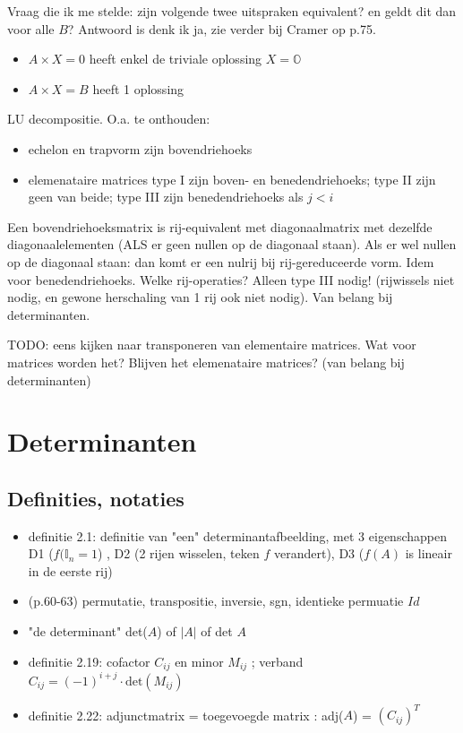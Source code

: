 \documentclass{article}
\begin{document}
Vraag die ik me stelde: zijn volgende twee uitspraken equivalent? en geldt dit dan voor alle $B$? Antwoord is denk ik ja, zie verder bij Cramer op p.75. 
\begin{itemize}
    \item $A\times X = 0$ heeft enkel de triviale oplossing $X=\mathbb{O}$
    \item $A \times X = B$ heeft 1 oplossing 
\end{itemize}

LU decompositie. O.a. te onthouden: 
\begin{itemize}
    \item echelon en trapvorm zijn bovendriehoeks
    \item elemenataire matrices type I zijn boven- en benedendriehoeks; type II zijn geen van beide; type III zijn benedendriehoeks als $j<i$
\end{itemize}

Een bovendriehoeksmatrix is rij-equivalent met diagonaalmatrix met dezelfde diagonaalelementen (ALS er geen nullen op de diagonaal staan). 
Als er wel nullen op de diagonaal staan: dan komt er een nulrij bij rij-gereduceerde vorm. Idem voor benedendriehoeks. Welke rij-operaties? Alleen type III nodig! (rijwissels niet nodig, en gewone herschaling van 1 rij ook niet nodig). Van belang bij determinanten. 

TODO: eens kijken naar transponeren van elementaire matrices. Wat voor matrices worden het? Blijven het elemenataire matrices? (van belang bij determinanten) 


\section{Determinanten}

\subsection{Definities, notaties}

\begin{itemize}
    \item definitie 2.1: definitie van "een" determinantafbeelding, met 3 eigenschappen D1 ($f(\mathbb{I}_n=1$) , D2 (2 rijen wisselen, teken $f$ verandert), D3 ($f(A)$ is lineair in de eerste rij)
    \item (p.60-63)  permutatie, transpositie, inversie, sgn, identieke permuatie $Id$ 
    \item "de determinant" det($A$) of $|A|$ of det $A$
    \item definitie 2.19: cofactor $C_{ij}$ en minor $M_{ij}$ ; verband $C_{ij} = (-1)^{i+j} \cdot \text{det}(M_{ij})$
    \item definitie 2.22: adjunctmatrix = toegevoegde matrix : adj($A$) = $(C_{ij})^T$
\end{itemize}
\end{document}
